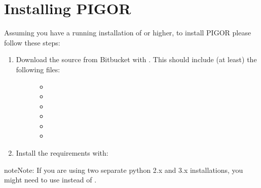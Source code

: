 \documentclass[letterpaper,10pt,english]{sphinxmanual}
\begin{document}
\section{Installing PIGOR}
\label{\detokenize{installation:installing-pigor}}\label{\detokenize{installation:installation}}
Assuming you have a running installation of  or higher, to install PIGOR please follow these steps:
\begin{enumerate}
\def\theenumi{\arabic{enumi}}
\def\labelenumi{\theenumi .}
\makeatletter\def\p@enumii{\p@enumi \theenumi .}\makeatother
\item {} \begin{description}
\item[{Download the source from Bitbucket with . This should include (at least) the following files:}] \leavevmode\begin{itemize}
\item {} 

\item {} 

\item {} 

\item {} 

\item {} 

\item {} 

\end{itemize}

\end{description}

\item {} 
Install the requirements with:

\begin{sphinxVerbatim}[commandchars=\\\{\}]
   
\end{sphinxVerbatim}

\end{enumerate}

\begin{sphinxadmonition}{note}{Note:}
If you are using two separate python 2.x and 3.x installations, you might need to use  instead of .
\end{sphinxadmonition}
\end{document}
